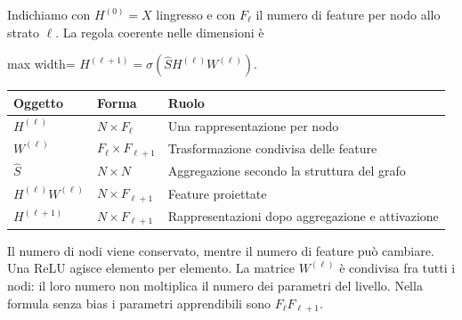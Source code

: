 \documentclass[11pt,a4paper,oneside,openany]{book}
\begin{document}
Indichiamo con \(H^{(0)}=X\) l\textquotesingle ingresso e con \(F_\ell\) il numero di feature per nodo allo strato \(\ell\). La regola coerente nelle dimensioni è

\begin{center}
\begin{adjustbox}{max width=\linewidth}
$\displaystyle \boxed{H^{(\ell+1)}=\sigma\left(\widehat S H^{(\ell)}W^{(\ell)}\right).}$
\end{adjustbox}
\end{center}

\begin{longtable}[]{@{}
  >{\raggedright\arraybackslash}p{}
  >{\raggedright\arraybackslash}p{}
  >{\raggedright\arraybackslash}p{}@{}}
\toprule\noalign{}
\begin{minipage}[b]{\linewidth}\raggedright
Oggetto
\end{minipage} & \begin{minipage}[b]{\linewidth}\raggedright
Forma
\end{minipage} & \begin{minipage}[b]{\linewidth}\raggedright
Ruolo
\end{minipage} \\
\midrule\noalign{}
\endhead
\bottomrule\noalign{}
\endlastfoot
\(H^{(\ell)}\) & \(N\times F_\ell\) & Una rappresentazione per nodo \\
\(W^{(\ell)}\) & \(F_\ell\times F_{\ell+1}\) & Trasformazione condivisa delle feature \\
\(\widehat S\) & \(N\times N\) & Aggregazione secondo la struttura del grafo \\
\(H^{(\ell)}W^{(\ell)}\) & \(N\times F_{\ell+1}\) & Feature proiettate \\
\(H^{(\ell+1)}\) & \(N\times F_{\ell+1}\) & Rappresentazioni dopo aggregazione e attivazione \\
\end{longtable}

Il numero di nodi viene conservato, mentre il numero di feature può cambiare. Una ReLU agisce elemento per elemento. La matrice \(W^{(\ell)}\) è condivisa fra tutti i nodi: il loro numero non moltiplica il numero dei parametri del livello. Nella formula senza bias i parametri apprendibili sono \(F_\ell F_{\ell+1}\).
\end{document}
